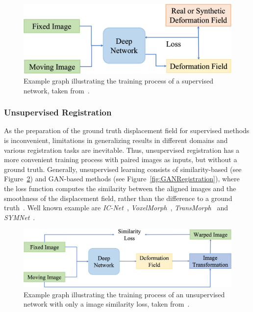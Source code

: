 \documentclass[english,version-2022-01]{uzl-thesis} %
\begin{document}
\begin{figure}[h] %
	\centering
	\graphicspath{{images/}{\main/images/}}
	\includegraphics[width=\linewidth]{SupervisedRegistrationGraph.jpg} 
	\caption{Example graph illustrating the training process of a supervised network, taken from~\cite{Zou2022}.}
	\label{fig:SupervisedRegistration}
\end{figure}


\subsubsection{Unsupervised Registration} \label{SubSubSec:UnsupervisedRegistration}
As the preparation of the ground truth displacement field for supervised methods is inconvenient, limitations in generalizing results in different domains and various registration tasks are inevitable. Thus, unsupervised registration has a more convenient training process with paired images as inputs, but without a ground truth. Generally, unsupervised learning consists of similarity-based (see Figure~\ref{fig:UnsupervisedRegistration}) and GAN-based methods (see Figure~\ref{fig:GANRegistration}), where the loss function computes the similarity between the aligned images and the smoothness of the displacement field, rather than the difference to a ground truth~\cite{Zou2022}. Well known example are \emph{IC-Net}~\cite{IC-Net},  \emph{VoxelMorph}~\cite{Voxelmorph}, \emph{TransMorph}~\cite{TransMorph} and \emph{SYMNet}~\cite{SYM-Net}.

\begin{figure}[h] %
	\centering
	\graphicspath{{images/}{\main/images/}}
	\includegraphics[width=\linewidth]{UnsupervisedRegistrationGraph.jpg} 
	\caption{Example graph illustrating the training process of an unsupervised network with only a image similarity loss, taken from~\cite{Zou2022}.}
	\label{fig:UnsupervisedRegistration}
\end{figure}
\end{document}
